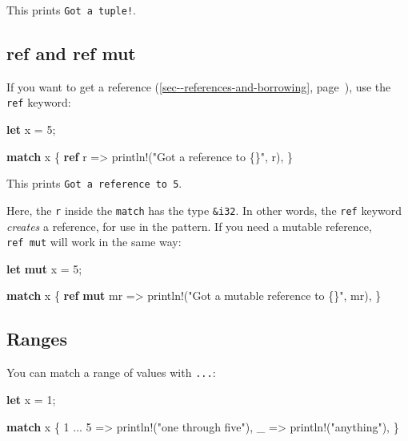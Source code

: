 \documentclass[a4paper,]{book}
\renewcommand*{\hyperref}[2][\ar]{%
  \def\ar{#2}%
  #2 (\autoref{#1}, page~\pageref{#1})}
\newenvironment{Shaded}{\begin{snugshade}}{\end{snugshade}}
\newcommand{\KeywordTok}[1]{\textcolor[rgb]{0.13,0.29,0.53}{\textbf{{#1}}}}
\newcommand{\DecValTok}[1]{\textcolor[rgb]{0.00,0.00,0.81}{{#1}}}
\newcommand{\StringTok}[1]{\textcolor[rgb]{0.31,0.60,0.02}{{#1}}}
\newcommand{\OtherTok}[1]{\textcolor[rgb]{0.56,0.35,0.01}{{#1}}}
\newcommand{\NormalTok}[1]{{#1}}
\begin{document}
This prints \texttt{Got\ a\ tuple!}.

\subsection{ref and ref mut}\label{ref-and-ref-mut}

If you want to get a
\hyperref[sec--references-and-borrowing]{reference}, use the
\texttt{ref} keyword:

\begin{Shaded}
\begin{Highlighting}[]
\KeywordTok{let} \NormalTok{x = }\DecValTok{5}\NormalTok{;}

\KeywordTok{match} \NormalTok{x \{}
    \KeywordTok{ref} \NormalTok{r => }\OtherTok{println!}\NormalTok{(}\StringTok{"Got a reference to \{\}"}\NormalTok{, r),}
\NormalTok{\}}
\end{Highlighting}
\end{Shaded}

This prints \texttt{Got\ a\ reference\ to\ 5}.

Here, the \texttt{r} inside the \texttt{match} has the type
\texttt{\&i32}. In other words, the \texttt{ref} keyword \emph{creates}
a reference, for use in the pattern. If you need a mutable reference,
\texttt{ref\ mut} will work in the same way:

\begin{Shaded}
\begin{Highlighting}[]
\KeywordTok{let} \KeywordTok{mut} \NormalTok{x = }\DecValTok{5}\NormalTok{;}

\KeywordTok{match} \NormalTok{x \{}
    \KeywordTok{ref} \KeywordTok{mut} \NormalTok{mr => }\OtherTok{println!}\NormalTok{(}\StringTok{"Got a mutable reference to \{\}"}\NormalTok{, mr),}
\NormalTok{\}}
\end{Highlighting}
\end{Shaded}

\subsection{Ranges}\label{ranges}

You can match a range of values with \texttt{...}:

\begin{Shaded}
\begin{Highlighting}[]
\KeywordTok{let} \NormalTok{x = }\DecValTok{1}\NormalTok{;}

\KeywordTok{match} \NormalTok{x \{}
    \DecValTok{1} \NormalTok{... }\DecValTok{5} \NormalTok{=> }\OtherTok{println!}\NormalTok{(}\StringTok{"one through five"}\NormalTok{),}
    \NormalTok{_ => }\OtherTok{println!}\NormalTok{(}\StringTok{"anything"}\NormalTok{),}
\NormalTok{\}}
\end{Highlighting}
\end{Shaded}
\end{document}
